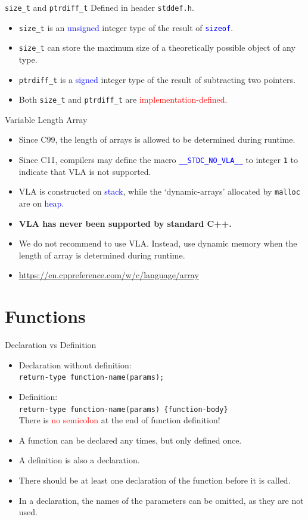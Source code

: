 \documentclass[handout]{beamer}
\newcommand{\red}[1]{\textcolor{red}{#1}}
\newcommand{\blue}[1]{\textcolor{blue}{#1}}
\newcommand{\ttt}[1]{\texttt{#1}}
\newcommand{\bluett}[1]{\blue{\ttt{#1}}}
\begin{document}
\begin{frame}{\ttt{size\_t} and \ttt{ptrdiff\_t}}
	Defined in header \ttt{stddef.h}.
	\begin{itemize}
		\item \ttt{size\_t} is an \blue{unsigned} integer type of the result of \bluett{sizeof}.
		\item \ttt{size\_t} can store the maximum size of a theoretically possible object of any type.
		\item \ttt{ptrdiff\_t} is a \blue{signed} integer type of the result of subtracting two pointers.
		\item Both \ttt{size\_t} and \ttt{ptrdiff\_t} are \red{implementation-defined}.
	\end{itemize}
\end{frame}

\begin{frame}{Variable Length Array}
	\begin{itemize}
		\item Since C99, the length of arrays is allowed to be determined during runtime.
		\item Since C11, compilers may define the macro \bluett{\_\_STDC\_NO\_VLA\_\_} to integer \ttt{1} to indicate that VLA is not supported.
		\item VLA is constructed on \blue{stack}, while the `dynamic-arrays' allocated by \ttt{malloc} are on \blue{heap}.
		\pause
		\item \textbf{VLA has never been supported by standard C++.}
		\item We do not recommend to use VLA. Instead, use dynamic memory when the length of array is determined during runtime.
		\item \url{https://en.cppreference.com/w/c/language/array}
	\end{itemize}
\end{frame}

\section{Functions}

\begin{frame}{Declaration vs Definition}
	\begin{itemize}
		\item Declaration without definition:\\
		\ttt{return-type function-name(params);}
		\item Definition:\\
		\ttt{return-type function-name(params) \{function-body\}}\\
		There is \red{no semicolon} at the end of function definition!
		\pause
		\item A function can be declared any times, but only defined once.
		\item A definition is also a declaration.
		\item There should be at least one declaration of the function before it is called.
		\item In a declaration, the names of the parameters can be omitted, as they are not used.
	\end{itemize}
\end{frame}
\end{document}
